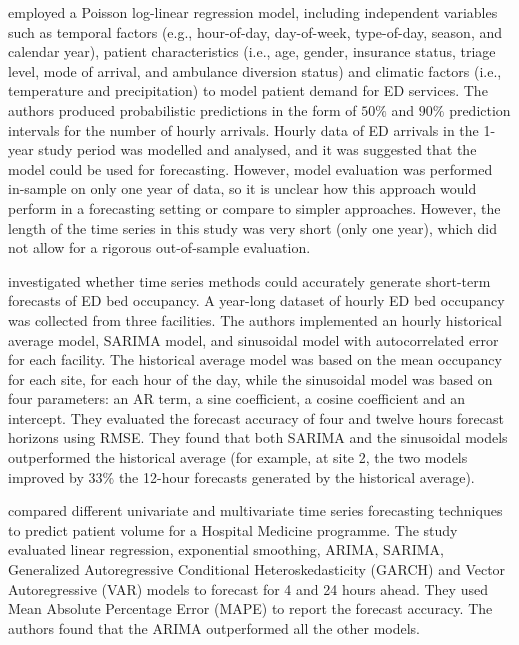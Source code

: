 \documentclass[]{elsarticle} %
\begin{document}
\citet{mccarthy2008challenge} employed a Poisson log-linear regression model, including independent variables such as temporal factors (e.g., hour-of-day, day-of-week, type-of-day, season, and calendar year), patient characteristics (i.e., age, gender, insurance status, triage level, mode of arrival, and ambulance diversion status) and climatic factors (i.e., temperature and precipitation) to model patient demand for ED services. The authors produced probabilistic predictions in the form of \(50\%\) and \(90\%\) prediction intervals for the number of hourly arrivals. Hourly data of ED arrivals in the 1-year study period was modelled and analysed, and it was suggested that the model could be used for forecasting. However, model evaluation was performed in-sample on only one year of data, so it is unclear how this approach would perform in a forecasting setting or compare to simpler approaches. However, the length of the time series in this study was very short (only one year), which did not allow for a rigorous out-of-sample evaluation.

\citet{schweigler2009forecasting} investigated whether time series methods could accurately generate short-term forecasts of ED bed occupancy. A year-long dataset of hourly ED bed occupancy was collected from three facilities. The authors implemented an hourly historical average model, SARIMA model, and sinusoidal model with autocorrelated error for each facility. The historical average model was based on the mean occupancy for each site, for each hour of the day, while the sinusoidal model was based on four parameters: an AR term, a sine coefficient, a cosine coefficient and an intercept. They evaluated the forecast accuracy of four and twelve hours forecast horizons using RMSE. They found that both SARIMA and the sinusoidal models outperformed the historical average (for example, at site 2, the two models improved by \(33\%\) the 12-hour forecasts generated by the historical average).

\citet{kim2014predicting} compared different univariate and multivariate time series forecasting techniques to predict patient volume for a Hospital Medicine programme. The study evaluated linear regression, exponential smoothing, ARIMA, SARIMA, Generalized Autoregressive Conditional Heteroskedasticity (GARCH) and Vector Autoregressive (VAR) models to forecast for 4 and 24 hours ahead. They used Mean Absolute Percentage Error (MAPE) to report the forecast accuracy. The authors found that the ARIMA outperformed all the other models.
\end{document}
